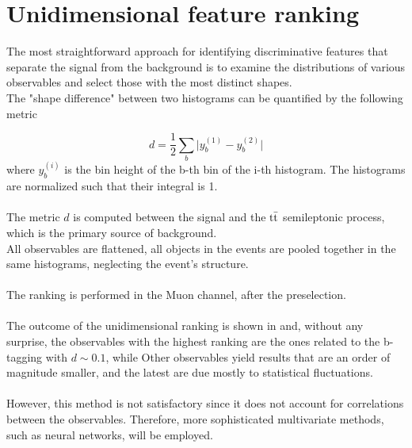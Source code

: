 \begin{minipage}[H]{\linewidth}
\begin{minipage}{0.62\linewidth}
\section{Unidimensional feature ranking}
The most straightforward approach for identifying discriminative features that separate the signal from the background is to examine the distributions of various observables and select those with the most distinct shapes.\\
The "shape difference" between two histograms can be quantified by the following metric

\begin{equation}
    d=\frac{1}{2}\sum_b \bigg| y_b^{(1)}-y_b^{(2)} \bigg|
\end{equation}
where $y_b^{(i)}$ is the bin height of the b-th bin of the i-th histogram. The histograms are normalized such that their integral is 1.\\
\\
The metric $d$ is computed between the signal and the ${{\text{t}}{\bar{\text{t}}}}$ semileptonic process, which is the primary source of background.\\
All observables are flattened, \ie all objects in the events are pooled together in the same histograms, neglecting the event's structure.\\
\\
The ranking is performed in the Muon channel, after the preselection.\\\\
The outcome of the unidimensional ranking is shown in  and, without any surprise, the observables with the highest ranking are the ones related to the b-tagging with $d\sim 0.1$, while Other observables yield results that are an order of magnitude smaller, and the latest are due mostly to statistical fluctuations.\\
\\
However, this method is not satisfactory since it does not account for correlations between the observables. Therefore, more sophisticated multivariate methods, such as neural networks, will be employed. \\\\\\\\\\    
\end{minipage}
\end{minipage}
